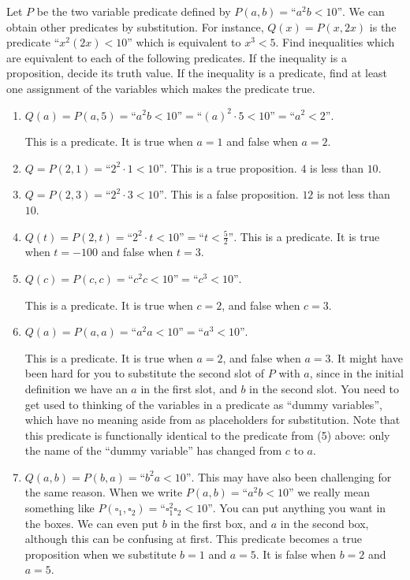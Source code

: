 \begin{solutions}
	Let $P$ be the two variable predicate defined by $P(a,b) = \textrm{``\(a^2b < 10\)''}$.  We can obtain other predicates by substitution.  For instance, $Q(x) = P(x,2x)$ is the predicate $\textrm{``\(x^2(2x) < 10\)''}$ which is equivalent to $x^3 < 5$.  Find inequalities which are equivalent to each of the following predicates.  If the inequality is a proposition, decide its truth value.  If the inequality is a predicate, find at least one assignment of the variables which makes the predicate true.
	\begin{enumerate}
		\item $Q(a) = P(a,5) = \textrm{``\(a^2b < 10\)''} = \textrm{``\((a)^2\cdot 5 < 10\)''} = \textrm{``\(a^2 < 2\)''}  $.  
		
		This is a predicate.  It is true when $a = 1$ and false when $a=2$.
		
		\item $Q = P(2,1) = \textrm{``\(2^2\cdot 1 < 10\)''} $.  This is a true proposition.  $4$ is less than $10$.
		\item $Q = P(2,3)= \textrm{``\(2^2 \cdot 3 < 10\)''} $.  This is a false proposition.  $12$ is not less than $10$.
		\item $Q(t) = P(2,t) = \textrm{``\(2^2\cdot t < 10\)''} =  \textrm{``\(t < \frac{5}{2}\)''}  $.  This is a predicate.  It is true when $t = -100$ and false when $t = 3$.
		\item $Q(c) = P(c,c)= \textrm{``\(c^2c < 10\)''}  = \textrm{``\(c^3 < 10\)''}$. 
		
		This is a predicate.  It is true when $c = 2$, and false when $c = 3$. 
		\item $Q(a) = P(a,a)= \textrm{``\(a^2a < 10\)''}  = \textrm{``\(a^3 < 10\)''}$. 
		
		This is a predicate.  It is true when $a = 2$, and false when $a = 3$.  It might have been hard for you to substitute the second slot of $P$ with $a$, since in the initial definition we have an $a$ in the first slot, and $b$ in the second slot. You need to get used to thinking of the variables in a predicate as ``dummy variables'', which have no meaning aside from as placeholders for substitution.  Note that this predicate is functionally identical to the predicate from (5) above:  only the name of the ``dummy variable'' has changed from $c$ to $a$. 
		\item $Q(a,b) = P(b,a)  = \textrm{``\(b^2a < 10\)''}$. This may have also been challenging for the same reason.  When we write $P(a,b) = \textrm{``\(a^2b < 10\)''}$ we really mean something like $P(\square_1,\square_2) = \textrm{``\(\square_1^2\square_2 < 10\)''}$.  You can put anything you want in the boxes.  We can even put $b$ in the first box, and $a$ in the second box, although this can be confusing at first.  This predicate becomes a true proposition when we substitute $b = 1$ and $a = 5$.  It is false when $b = 2$ and $a = 5$.
	\end{enumerate}
\end{solutions}

